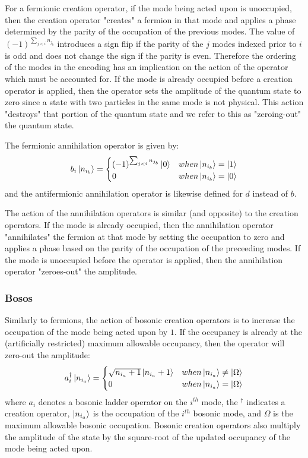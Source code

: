 For a fermionic creation operator, if the mode being acted upon is unoccupied, then the creation operator "creates" a fermion in that mode and applies a phase determined by the parity of the occupation of the previous modes.
The value of $(-1)^{\sum_{j < i} n_{j_b}}$ introduces a sign flip if the parity of the $j$ modes indexed prior to $i$ is odd and does not change the sign if the parity is even. 
Therefore the ordering of the modes in the encoding has an implication on the action of the operator which must be accounted for.
If the mode is already occupied before a creation operator is applied, then the operator sets the amplitude of the quantum state to zero since a state with two particles in the same mode is not physical.
This action "destroys" that portion of the quantum state and we refer to this as "zeroing-out" the quantum state. 

The fermionic annihilation operator is given by:
\begin{equation}
    b_i \ket{n_{i_b}} = 
    \begin{cases} 
        (-1)^{\sum_{j < i} n_{j_b}} \ket{0}  & when \ket{n_{i_b}} = \ket{1} \\
        0 & when \ket{n_{i_b}} = \ket{0}
    \end{cases}
\end{equation}
and the antifermionic annihilation operator is likewise defined for $d$ instead of $b$.

The action of the annihilation operators is similar (and opposite) to the creation operators.
If the mode is already occupied, then the annihilation operator "annihilates" the fermion at that mode by setting the occupation to zero and applies a phase based on the parity of the occupation of the preceeding modes.
If the mode is unoccupied before the operator is applied, then the annihilation operator "zeroes-out" the amplitude.

\subsubsection{Bosos}

Similarly to fermions, the action of bosonic creation operators is to increase the occupation of the mode being acted upon by $1$.
If the occupancy is already at the (artificially restricted) maximum allowable occupancy, then the operator will zero-out the amplitude:
\begin{equation}
    \label{eq:bosonic-creation}
    a_i^\dagger \ket{n_{i_a}} = 
    \begin{cases} 
        \sqrt{n_{i_a} + 1} \ket{n_{i_a} + 1}  & when \ket{n_{i_a}} \neq \ket{\Omega} \\
        0 & when \ket{n_{i_a}} = \ket{\Omega}
    \end{cases}
\end{equation}
where $a_i$ denotes a bosonic ladder operator on the $i^{th}$ mode, the $^\dagger$ indicates a creation operator, $\ket{n_{i_a}}$ is the occupation of the $i^{th}$ bosonic mode, and $\Omega$ is the maximum allowable bosonic occupation.
Bosonic creation operators also multiply the amplitude of the state by the square-root of the updated occupancy of the mode being acted upon.

